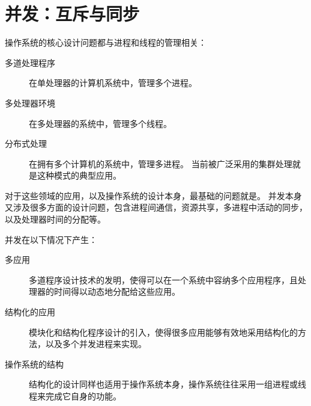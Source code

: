 
\chapter{并发：互斥与同步}
{
    操作系统的核心设计问题都与进程和线程的管理相关：

    \begin{description}
        \item[多道处理程序] 在单处理器的计算机系统中，管理多个进程。
        \item[多处理器环境] 在多处理器的系统中，管理多个线程。
        \item[分布式处理]
        {
            在拥有多个计算机的系统中，管理多进程。
            当前被广泛采用的集群处理就是这种模式的典型应用。
        }
    \end{description}

    对于这些领域的应用，以及操作系统的设计本身，最基础的问题就是。
    并发本身又涉及很多方面的设计问题，包含进程间通信，资源共享，多进程中活动的同步，以及处理器时间的分配等。

    并发在以下情况下产生：

    \begin{description}
        \item[多应用] 多道程序设计技术的发明，使得可以在一个系统中容纳多个应用程序，且处理器的时间得以动态地分配给这些应用。
        \item[结构化的应用] 模块化和结构化程序设计的引入，使得很多应用能够有效地采用结构化的方法，以及多个并发进程来实现。
        \item[操作系统的结构] 结构化的设计同样也适用于操作系统本身，操作系统往往采用一组进程或线程来完成它自身的功能。
    \end{description}

    
}

\cleardoublepage

\endinput
